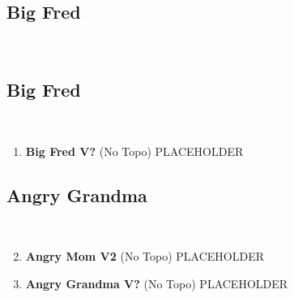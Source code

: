 \begin{multicols*}{2}
		\section{Big Fred}\label{sa:Big Fred}
	\
			\subsection*{Big Fred}\label{bf:Big Fred}
			\
			
				\begin{enumerate}[]
					\setcounter{enumi}{0}
					\item\label{rt:Big Fred} \colorbox{black!20}{\textbf{Big Fred V?  } }
						\newline (No Topo) 
					\newline PLACEHOLDER\
				\end{enumerate}
			\subsection*{Angry Grandma}\label{bf:Angry Grandma}
			\
			
				\begin{enumerate}[]
					\setcounter{enumi}{1}
					\item\label{rt:Angry Mom} \colorbox{green!20}{\textbf{Angry Mom V2  } }
						\newline (No Topo) 
					\newline PLACEHOLDER\
					\setcounter{enumi}{2}
					\item\label{rt:Angry Grandma} \colorbox{black!20}{\textbf{Angry Grandma V?  } }
						\newline (No Topo) 
					\newline PLACEHOLDER\
				\end{enumerate}
\end{multicols*}
\clearpage